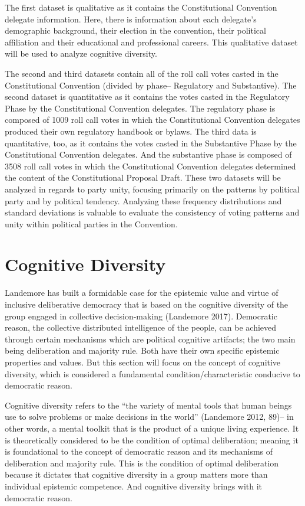 \documentclass[
]{article}
\begin{document}
The first dataset is qualitative as it contains the Constitutional
Convention delegate information. Here, there is information about each
delegate's demographic background, their election in the convention,
their political affiliation and their educational and professional
careers. This qualitative dataset will be used to analyze cognitive
diversity.

The second and third datasets contain all of the roll call votes casted
in the Constitutional Convention (divided by phase-- Regulatory and
Substantive). The second dataset is quantitative as it contains the
votes casted in the Regulatory Phase by the Constitutional Convention
delegates. The regulatory phase is composed of 1009 roll call votes in
which the Constitutional Convention delegates produced their own
regulatory handbook or bylaws. The third data is quantitative, too, as
it contains the votes casted in the Substantive Phase by the
Constitutional Convention delegates. And the substantive phase is
composed of 3508 roll call votes in which the Constitutional Convention
delegates determined the content of the Constitutional Proposal Draft.
These two datasets will be analyzed in regards to party unity, focusing
primarily on the patterns by political party and by political tendency.
Analyzing these frequency distributions and standard deviations is
valuable to evaluate the consistency of voting patterns and unity within
political parties in the Convention.

\hypertarget{cognitive-diversity}{%
\section{Cognitive Diversity}\label{cognitive-diversity}}

Landemore has built a formidable case for the epistemic value and virtue
of inclusive deliberative democracy that is based on the cognitive
diversity of the group engaged in collective decision-making (Landemore
2017). Democratic reason, the collective distributed intelligence of the
people, can be achieved through certain mechanisms which are political
cognitive artifacts; the two main being deliberation and majority rule.
Both have their own specific epistemic properties and values. But this
section will focus on the concept of cognitive diversity, which is
considered a fundamental condition/characteristic conducive to
democratic reason.

Cognitive diversity refers to the ``the variety of mental tools that
human beings use to solve problems or make decisions in the world''
(Landemore 2012, 89)-- in other words, a mental toolkit that is the
product of a unique living experience. It is theoretically considered to
be the condition of optimal deliberation; meaning it is foundational to
the concept of democratic reason and its mechanisms of deliberation and
majority rule. This is the condition of optimal deliberation because it
dictates that cognitive diversity in a group matters more than
individual epistemic competence. And cognitive diversity brings with it
democratic reason.
\end{document}
